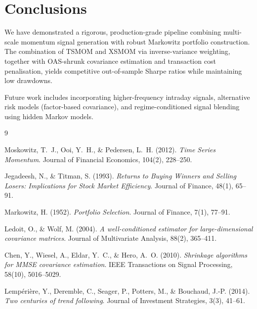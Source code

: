 \documentclass[11pt,a4paper]{article}
\begin{document}
\section{Conclusions}

We have demonstrated a rigorous, production-grade pipeline combining multi-scale
momentum signal generation with robust Markowitz portfolio construction. The
combination of TSMOM and XSMOM via inverse-variance weighting, together with
OAS-shrunk covariance estimation and transaction cost penalisation, yields
competitive out-of-sample Sharpe ratios while maintaining low drawdowns.

Future work includes incorporating higher-frequency intraday signals, alternative
risk models (factor-based covariance), and regime-conditioned signal blending using
hidden Markov models.


\begin{thebibliography}{9}

Moskowitz, T.~J., Ooi, Y.~H., \& Pedersen, L.~H. (2012).
\textit{Time Series Momentum}.
Journal of Financial Economics, 104(2), 228--250.

Jegadeesh, N., \& Titman, S. (1993).
\textit{Returns to Buying Winners and Selling Losers: Implications for Stock Market Efficiency}.
Journal of Finance, 48(1), 65--91.

Markowitz, H. (1952).
\textit{Portfolio Selection}.
Journal of Finance, 7(1), 77--91.

Ledoit, O., \& Wolf, M. (2004).
\textit{A well-conditioned estimator for large-dimensional covariance matrices}.
Journal of Multivariate Analysis, 88(2), 365--411.

Chen, Y., Wiesel, A., Eldar, Y.~C., \& Hero, A.~O. (2010).
\textit{Shrinkage algorithms for MMSE covariance estimation}.
IEEE Transactions on Signal Processing, 58(10), 5016--5029.

Lempérière, Y., Deremble, C., Seager, P., Potters, M., \& Bouchaud, J.-P. (2014).
\textit{Two centuries of trend following}.
Journal of Investment Strategies, 3(3), 41--61.

\end{thebibliography}
\end{document}
